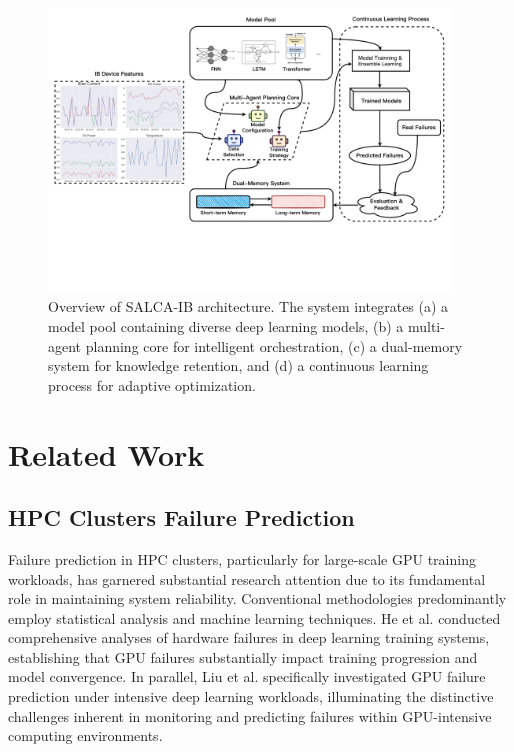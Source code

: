 \documentclass[conference]{IEEEtran}
\begin{document}
\begin{figure}[htbp]
    \centering
    \includegraphics[width=0.95\textwidth]{fig/agent.pdf}
    \caption{Overview of SALCA-IB architecture. The system integrates (a) a model pool containing diverse deep learning models, (b) a multi-agent planning core for intelligent orchestration, (c) a dual-memory system for knowledge retention, and (d) a continuous learning process for adaptive optimization.}
    \label{fig:salca-ib}
\end{figure}


\section{Related Work}

\subsection{HPC Clusters Failure Prediction}
Failure prediction in HPC clusters, particularly for large-scale GPU training workloads, has garnered substantial research attention due to its fundamental role in maintaining system reliability. Conventional methodologies predominantly employ statistical analysis and machine learning techniques. He et al. \cite{b6} conducted comprehensive analyses of hardware failures in deep learning training systems, establishing that GPU failures substantially impact training progression and model convergence. In parallel, Liu et al. \cite{b8} specifically investigated GPU failure prediction under intensive deep learning workloads, illuminating the distinctive challenges inherent in monitoring and predicting failures within GPU-intensive computing environments.
\end{document}
